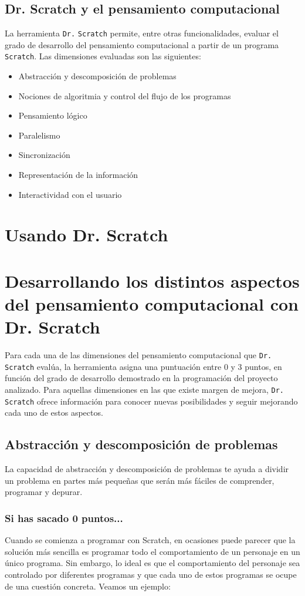 \documentclass[a4paper,10pt]{article}
\begin{document}
\subsection*{Dr. Scratch y el pensamiento computacional}
La herramienta \texttt{Dr.}{\tiny{ }}\texttt{Scratch} permite, entre otras funcionalidades, evaluar el grado de desarrollo del pensamiento computacional a partir de un programa \texttt{Scratch}. Las dimensiones evaluadas son las siguientes:
\begin{itemize}
 \item Abstracción y descomposición de problemas
 \item Nociones de algoritmia y control del flujo de los programas
 \item Pensamiento lógico
 \item Paralelismo
 \item Sincronización
 \item Representación de la información
 \item Interactividad con el usuario
\end{itemize}

\section{Usando Dr. Scratch}

\section{Desarrollando los distintos aspectos del pensamiento computacional con Dr. Scratch}
Para cada una de las dimensiones del pensamiento computacional que \texttt{Dr.}{\tiny{ }}\texttt{Scratch} evalúa, la herramienta asigna una puntuación entre 0 y 3 puntos, en función del grado de desarrollo demostrado en la programación del proyecto analizado. Para aquellas dimensiones en las que existe margen de mejora, \texttt{Dr.}{\tiny{ }}\texttt{Scratch} ofrece información para conocer nuevas posibilidades y seguir mejorando cada uno de estos aspectos.
\subsection{Abstracción y descomposición de problemas}
La capacidad de abstracción y descomposición de problemas te ayuda a dividir un problema en partes más pequeñas que serán más fáciles de comprender, programar y depurar.
\subsubsection{Si has sacado 0 puntos...}
Cuando se comienza a programar con Scratch, en ocasiones puede parecer que la solución más sencilla es programar todo el comportamiento de un personaje en un único programa. Sin embargo, lo ideal es que el comportamiento del personaje sea controlado por diferentes programas y que cada uno de estos programas se ocupe de una cuestión concreta. Veamos un ejemplo:
\end{document}
